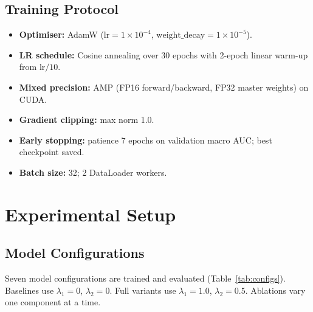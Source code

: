 \documentclass[12pt, a4paper]{article}
\begin{document}
\subsection{Training Protocol}

\begin{itemize}[leftmargin=1.5em, itemsep=2pt]
  \item \textbf{Optimiser:} AdamW ($\text{lr}=1\times10^{-4}$,
        $\text{weight\_decay}=1\times10^{-5}$).
  \item \textbf{LR schedule:} Cosine annealing over 30 epochs with 2-epoch linear
        warm-up from $\text{lr}/10$.
  \item \textbf{Mixed precision:} AMP (FP16 forward/backward, FP32 master weights) on CUDA.
  \item \textbf{Gradient clipping:} max norm 1.0.
  \item \textbf{Early stopping:} patience 7 epochs on validation macro AUC; best
        checkpoint saved.
  \item \textbf{Batch size:} 32; 2 DataLoader workers.
\end{itemize}

\section{Experimental Setup}

\subsection{Model Configurations}

Seven model configurations are trained and evaluated (Table~\ref{tab:configs}).
Baselines use $\lambda_1=0$, $\lambda_2=0$. Full variants use $\lambda_1=1.0$,
$\lambda_2=0.5$. Ablations vary one component at a time.
\end{document}
